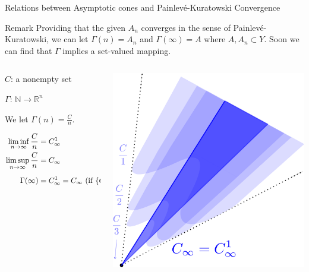 \documentclass[aspectratio=169, dvipdfmx, 11pt]{beamer} %
\newcommand{\NaturalNumberSet}{\mathbb{N}}
\newcommand{\NDemenstionalRealEuclideanSpace}{\mathbb{R}^n}
\newcommand{\Painleve}{Painlev\'e}
\begin{document}
\begin{frame}[t]{Relations between Asymptotic cones and \Painleve-Kuratowski Convergence}

\begin{alertblock}{Remark}
    Providing that the given $A_n$ converges in the sense of \Painleve-Kuratowski, we can let $\Gamma (n) = A_n$ and $\Gamma (\infty) = A$ where $A, A_n \subset Y$.
    Soon we can find that $\Gamma$ implies a set-valued mapping.
\end{alertblock}

\begin{columns}
    \begin{column}{0.48\textwidth}
    $C$: a nonempty set

    $\Gamma$: $\NaturalNumberSet \rightarrow \NDemenstionalRealEuclideanSpace$

    We let $\Gamma (n) = \frac{C}{n}$.

    \pause
    \centering
    \begin{equation}
        \begin{split}
            \liminf_{n \to \infty} \frac{C}{n} &= C^1_{\infty} \\
            \limsup_{n \to \infty}\frac{C}{n} &= C_{\infty} \\
            \Gamma (\infty) &= C^1_{\infty} = C_{\infty} \text{ (if $\{C_n\}_{n \in \NaturalNumberSet} \coloneqq \frac{C}{n}$ converges in the sense of \Painleve-Kuratowski)} \notag
        \end{split}
    \end{equation}
    \end{column}
    \pause
    \begin{column}{0.48\textwidth}
    \centering
    \includegraphics[keepaspectratio, scale=0.08]{figures/relation_asymptotice_cone_and_p_k_convergence.eps}
    \end{column}
\end{columns}
\end{frame}
\end{document}
